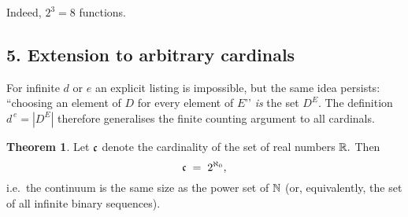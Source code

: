 \documentclass[12pt]{article}
\theoremstyle{definition} %
\newtheorem{theorem}{Theorem}
\theoremstyle{plain} %
\begin{document}
  Indeed, \(2^{3}=8\) functions.
  
  \subsection*{5.  Extension to arbitrary cardinals}
  For infinite \(d\) or \(e\) an explicit listing is impossible,
  but the same idea persists:
  “choosing an element of \(D\) for every element of \(E\)’’
  \emph{is} the set \(D^{E}\).
  The definition \(d^{\,e}=|D^{E}|\) therefore generalises the
  finite counting argument to all cardinals.
  \begin{theorem}
    \label{thm:continuum}
    Let $\frak c$ denote the cardinality of the set of real numbers
    $\Bbb R.$
    Then
    \[
      \frak c \;=\; 2^{\aleph_0},
    \]
    i.e.\ the continuum is the same size as the power set of
    $\Bbb N$ (or, equivalently, the set of all infinite binary
    sequences).
    \end{theorem}
    
\end{document}
